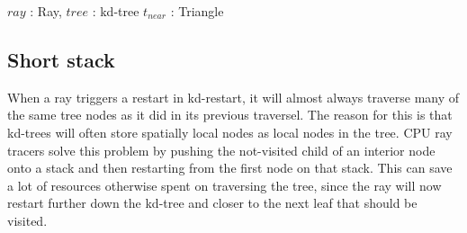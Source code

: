 \begin{algorithm}
  \caption{A kd-restart implementation of ClosestTriangle}
  \label{alg:KDRestart}
  \begin{algorithmic}
              {$ray$ : Ray, $tree$ : kd-tree}
              {$t_{near}$ : Triangle}{
                    \ELSE
                    \ENDIF
                  \ENDWHILE
                  \ELSE
                  \ENDIF
                \ENDWHILE
              }
  \end{algorithmic}
\end{algorithm}

\subsection{Short stack}\label{sec:shortStack}


When a ray triggers a restart in kd-restart, it will almost always traverse many
of the same tree nodes as it did in its previous traversel. The reason for this
is that kd-trees will often store spatially local nodes as local nodes in the
tree. CPU ray tracers solve this problem by pushing the not-visited child of an
interior node onto a stack and then restarting from the first node on that
stack. This can save a lot of resources otherwise spent on traversing the tree,
since the ray will now restart further down the kd-tree and closer to the next
leaf that should be visited.

